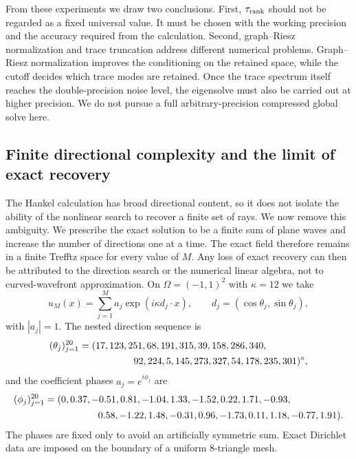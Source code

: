\documentclass[pdflatex,sn-mathphys-num]{sn-jnl}
\theoremstyle{thmstyleone}
\theoremstyle{thmstyletwo}
\begin{document}
From these experiments we draw two conclusions.  First, $\tau_{\rm rank}$ should not be regarded as a fixed universal value.  It must be chosen with the working precision and the accuracy required from the calculation.  Second, graph--Riesz normalization and trace truncation address different numerical problems.  Graph--Riesz normalization improves the conditioning on the retained space, while the cutoff decides which trace modes are retained.  Once the trace spectrum itself reaches the double-precision noise level, the eigensolve must also be carried out at higher precision.  We do not pursue a full arbitrary-precision compressed global solve here.

\subsection{Finite directional complexity and the limit of exact recovery}\label{subsec:finite-capacity}
The Hankel calculation has broad directional content, so it does not isolate the ability of the nonlinear search to recover a finite set of rays.  We now remove this ambiguity.  We prescribe the exact solution to be a finite sum of plane waves and increase the number of directions one at a time.  The exact field therefore remains in a finite Trefftz space for every value of $M$.  Any loss of exact recovery can then be attributed to the direction search or the numerical linear algebra, not to curved-wavefront approximation.  On $\Omega=(-1,1)^2$ with $\kappa=12$ we take
\begin{equation}\label{eq:finite-sum}
 u_M(x)=\sum_{j=1}^{M}a_j\exp(i\kappa d_j\cdot x),
 \qquad d_j=(\cos\theta_j,\sin\theta_j),
\end{equation}
with $|a_j|=1$.  The nested direction sequence is
\[
\begin{aligned}
 &(\theta_j)_{j=1}^{20}=(17,123,251,68,191,315,39,158,286,340,\\
 &\hspace{8.8em}92,224,5,145,273,327,54,178,235,301)^\circ,
\end{aligned}
\]
and the coefficient phases $a_j=e^{i\phi_j}$ are
\[
\begin{aligned}
 &(\phi_j)_{j=1}^{20}=(0,0.37,-0.51,0.81,-1.04,1.33,-1.52,0.22,1.71,-0.93,\\
 &\hspace{8.8em}0.58,-1.22,1.48,-0.31,0.96,-1.73,0.11,1.18,-0.77,1.91).
\end{aligned}
\]
The phases are fixed only to avoid an artificially symmetric sum.  Exact Dirichlet data are imposed on the boundary of a uniform 8-triangle mesh.
\end{document}
